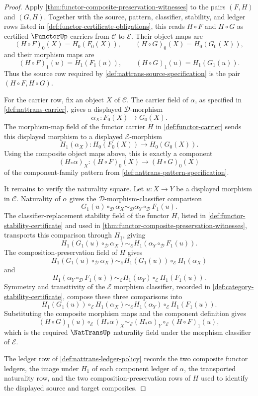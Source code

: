 \begin{proof}
Apply \autoref{thm:functor-composite-preservation-witnesses} to the pairs $(F,H)$ and $(G,H)$. Together with the source, pattern, classifier, stability, and ledger rows listed in \autoref{def:functor-certificate-obligations}, this reads $H\circ F$ and $H\circ G$ as certified $\FunctorUp$ carriers from $\mathcal C$ to $\mathcal E$. Their object maps are
$$
(H\circ F)_0(X)=H_0(F_0(X)),
\qquad
(H\circ G)_0(X)=H_0(G_0(X)),
$$
and their morphism maps are
$$
(H\circ F)_1(u)=H_1(F_1(u)),
\qquad
(H\circ G)_1(u)=H_1(G_1(u)).
$$
Thus the source row required by \autoref{def:nattrans-source-specification} is the pair $(H\circ F,H\circ G)$.

For the carrier row, fix an object $X$ of $\mathcal C$. The carrier field of $\alpha$, as specified in \autoref{def:nattrans-carrier}, gives a displayed $\mathcal D$-morphism
$$
\alpha_X:F_0(X)\to G_0(X).
$$
The morphism-map field of the functor carrier $H$ in \autoref{def:functor-carrier} sends this displayed morphism to a displayed $\mathcal E$-morphism
$$
H_1(\alpha_X):H_0(F_0(X))\to H_0(G_0(X)).
$$
Using the composite object maps above, this is exactly a component
$$
(H_{\ast}\alpha)_X:(H\circ F)_0(X)\to (H\circ G)_0(X)
$$
of the component-family pattern from \autoref{def:nattrans-pattern-specification}.

It remains to verify the naturality square. Let $u:X\to Y$ be a displayed morphism in $\mathcal C$. Naturality of $\alpha$ gives the $\mathcal D$-morphism-classifier comparison
$$
G_1(u)\circ_{\mathcal D}\alpha_X
\sim_{\mathcal D}
\alpha_Y\circ_{\mathcal D}F_1(u).
$$
The classifier-replacement stability field of the functor $H$, listed in \autoref{def:functor-stability-certificate} and used in \autoref{thm:functor-composite-preservation-witnesses}, transports this comparison through $H_1$, giving
$$
H_1(G_1(u)\circ_{\mathcal D}\alpha_X)
\sim_{\mathcal E}
H_1(\alpha_Y\circ_{\mathcal D}F_1(u)).
$$
The composition-preservation field of $H$ gives
$$
H_1(G_1(u)\circ_{\mathcal D}\alpha_X)
\sim_{\mathcal E}
H_1(G_1(u))\circ_{\mathcal E}H_1(\alpha_X)
$$
and
$$
H_1(\alpha_Y\circ_{\mathcal D}F_1(u))
\sim_{\mathcal E}
H_1(\alpha_Y)\circ_{\mathcal E}H_1(F_1(u)).
$$
Symmetry and transitivity of the $\mathcal E$ morphism classifier, recorded in \autoref{def:category-stability-certificate}, compose these three comparisons into
$$
H_1(G_1(u))\circ_{\mathcal E}H_1(\alpha_X)
\sim_{\mathcal E}
H_1(\alpha_Y)\circ_{\mathcal E}H_1(F_1(u)).
$$
Substituting the composite morphism maps and the component definition gives
$$
(H\circ G)_1(u)\circ_{\mathcal E}(H_{\ast}\alpha)_X
\sim_{\mathcal E}
(H_{\ast}\alpha)_Y\circ_{\mathcal E}(H\circ F)_1(u),
$$
which is the required $\NatTransUp$ naturality field under the morphism classifier of $\mathcal E$.

The ledger row of \autoref{def:nattrans-ledger-policy} records the two composite functor ledgers, the image under $H_1$ of each component ledger of $\alpha$, the transported naturality row, and the two composition-preservation rows of $H$ used to identify the displayed source and target composites.
\end{proof}

